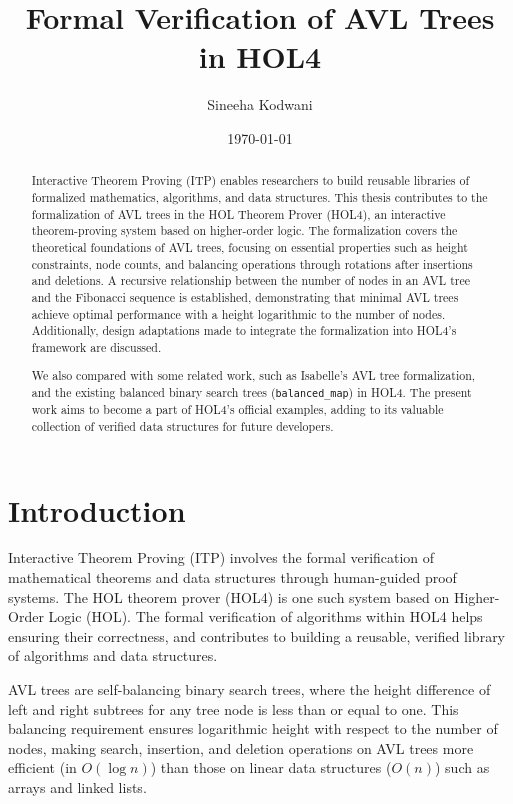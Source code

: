 \documentclass[12pt]{article}
\title{Formal Verification of AVL Trees in HOL4}
\author{Sineeha Kodwani}
\date{\today}
\begin{document}
\maketitle

\begin{abstract}
Interactive Theorem Proving (ITP) enables researchers to build reusable libraries of formalized mathematics, algorithms, and data structures. This thesis contributes to the formalization of AVL trees in the HOL Theorem Prover (HOL4), an interactive theorem-proving system based on higher-order logic. The formalization covers the theoretical foundations of AVL trees, focusing on essential properties such as height constraints, node counts, and balancing operations through rotations after insertions and deletions. A recursive relationship between the number of nodes in an AVL tree and the Fibonacci sequence is established, demonstrating that minimal AVL trees achieve optimal performance with a height logarithmic to the number of nodes. Additionally, design adaptations made to integrate the formalization into HOL4’s framework are discussed.

We also compared with some related work, such as Isabelle's AVL tree formalization, and the existing balanced binary search trees (\verb|balanced_map|) in HOL4. The present work aims to become a part of HOL4's official examples, adding to its valuable collection of verified data structures for future developers.
\end{abstract}

\section{Introduction}

Interactive Theorem Proving (ITP) involves the formal verification of mathematical theorems and data structures through human-guided proof systems. The HOL theorem prover (HOL4) is one such system based on Higher-Order Logic (HOL). The formal verification of algorithms within HOL4 helps ensuring their correctness, and contributes to building a reusable, verified library of algorithms and data structures.

AVL trees are self-balancing binary search trees, where the height difference of left and right subtrees for any tree node is less than or equal to one. This balancing requirement ensures logarithmic height with respect to the number of nodes, making search, insertion, and deletion operations on AVL trees more efficient (in $O(\log{n})$) than
those on linear data structures ($O(n)$) such as arrays and linked lists.
\end{document}
